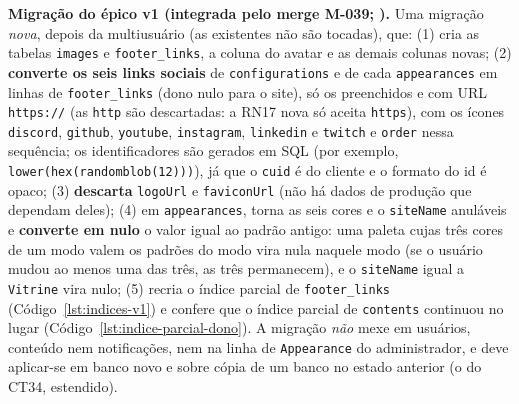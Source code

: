 \textbf{Migração do épico v1 (integrada pelo merge M-039; ).} Uma migração \emph{nova}, depois da multiusuário (as existentes não são tocadas), que: (1) cria as tabelas \texttt{images} e \texttt{footer\_links}, a coluna do avatar e as demais colunas novas; (2) \textbf{converte os seis links sociais} de \texttt{configurations} e de cada \texttt{appearances} em linhas de \texttt{footer\_links} (dono nulo para o site), só os preenchidos e com URL \texttt{https://} (as \texttt{http} são descartadas: a RN17 nova só aceita \texttt{https}), com os ícones \texttt{discord}, \texttt{github}, \texttt{youtube}, \texttt{instagram}, \texttt{linkedin} e \texttt{twitch} e \texttt{order} nessa sequência; os identificadores são gerados em SQL (por exemplo, \texttt{lower(hex(randomblob(12)))}), já que o \texttt{cuid} é do cliente e o formato do id é opaco; (3) \textbf{descarta} \texttt{logoUrl} e \texttt{faviconUrl} (não há dados de produção que dependam deles); (4) em \texttt{appearances}, torna as seis cores e o \texttt{siteName} anuláveis e \textbf{converte em nulo} o valor igual ao padrão antigo: uma paleta cujas três cores de um modo valem os padrões do modo vira nula naquele modo (se o usuário mudou ao menos uma das três, as três permanecem), e o \texttt{siteName} igual a \texttt{Vitrine} vira nulo; (5) recria o índice parcial de \texttt{footer\_links} (Código~\ref{lst:indices-v1}) e confere que o índice parcial de \texttt{contents} continuou no lugar (Código~\ref{lst:indice-parcial-dono}). A migração \emph{não} mexe em usuários, conteúdo nem notificações, nem na linha de \texttt{Appearance} do administrador, e deve aplicar-se em banco novo e sobre cópia de um banco no estado anterior (o  do CT34, estendido).

